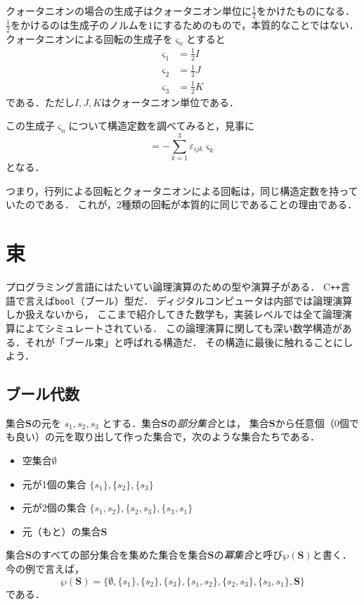 \documentclass{jsbook}
\newcommand{\cxx}{\textrm{C}\texttt{++}}
\newcommand{\ccode}[1]{\texttt{#1}}
\newcommand{\keyword}[1]{\emph{#1}}
\newcommand{\bg}[1]{\mathbf{#1}}
\begin{document}
クォータニオンの場合の生成子はクォータニオン単位に$\frac{1}{2}$をかけたものになる．
$\frac{1}{2}$をかけるのは生成子のノルムを$1$にするためのもので，本質的なことではない．
クォータニオンによる回転の生成子を$\varsigma_n$とすると
\begin{align}
\varsigma_1&=\frac{1}{2}I\\
\varsigma_2&=\frac{1}{2}J\\
\varsigma_3&=\frac{1}{2}K
\end{align}
である．ただし$I,J,K$はクォータニオン単位である．

この生成子$\varsigma_n$について構造定数を調べてみると，見事に
\begin{equation}
[\varsigma_i,\varsigma_j]=-\sum_{k=1}^3\varepsilon_{ijk}\varsigma_k
\end{equation}
となる．

つまり，行列による回転とクォータニオンによる回転は，同じ構造定数を持っていたのである．
これが，2種類の回転が本質的に同じであることの理由である．


\chapter{束}

プログラミング言語にはたいてい論理演算のための型や演算子がある．
\cxx 言語で言えば\ccode{bool}（ブール）型だ．
ディジタルコンピュータは内部では論理演算しか扱えないから，
ここまで紹介してきた数学も，実装レベルでは全て論理演算によてシミュレートされている．
この論理演算に関しても深い数学構造がある．それが「ブール束」と呼ばれる構造だ．
その構造に最後に触れることにしよう．

\section{ブール代数}

集合$\bg{S}$の元を $s_1,s_2,s_3$ とする．集合$\bg{S}$の\keyword{部分集合}とは，
集合$\bg{S}$から任意個（0個でも良い）の元を取り出して作った集合で，次のような集合たちである．
\begin{itemize}
\item 空集合$\emptyset$
\item 元が1個の集合 $\{s_1\},\{s_2\},\{s_3\}$
\item 元が2個の集合 $\{s_1,s_2\},\{s_2,s_3\},\{s_3,s_1\}$
\item 元（もと）の集合$\bg{S}$
\end{itemize}
集合$\bg{S}$のすべての部分集合を集めた集合を集合$\bg{S}$の\keyword{冪集合}と呼び$\wp(\bg{S})$と書く．
今の例で言えば，
\begin{equation}
\wp(\bg{S})=\{\emptyset,\{s_1\},\{s_2\},\{s_3\},\{s_1,s_2\},\{s_2,s_3\},\{s_3,s_1\},\bg{S}\}
\end{equation}
である．
\end{document}

